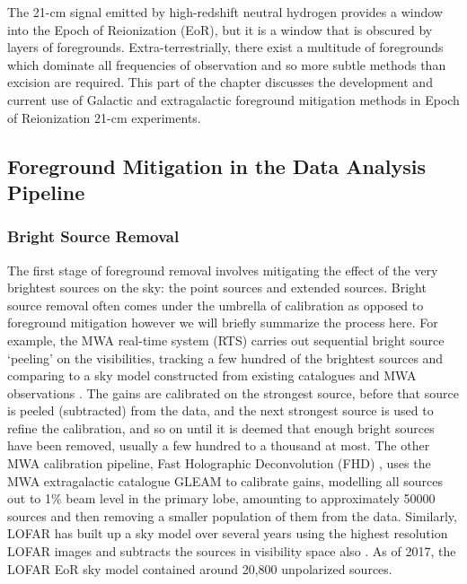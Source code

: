 The 21-cm signal emitted by high-redshift neutral hydrogen provides a window into the Epoch of Reionization (EoR), but it is a window that is obscured by layers of foregrounds. Extra-terrestrially, there exist a multitude of foregrounds which dominate all frequencies of observation and so more subtle methods than excision are required. This part of the chapter discusses the development and current use of Galactic and extragalactic foreground mitigation methods in Epoch of Reionization 21-cm experiments.

\subsection{Foreground Mitigation in the Data Analysis Pipeline}
\subsubsection{Bright Source Removal}
The first stage of foreground removal involves mitigating the effect of the very brightest sources on the sky: the point sources and extended sources. Bright source removal often comes under the umbrella of calibration as opposed to foreground mitigation however we will briefly summarize the process here. For example, the MWA real-time system (RTS) \cite{Mitchell2008ISTSP...2..707M} carries out sequential bright source `peeling' on the visibilities, tracking a few hundred of the brightest sources and comparing to a sky model constructed from existing catalogues and MWA observations \cite{Carroll2016MNRAS.461.4151C}. The gains are calibrated on the strongest source, before that source is peeled (subtracted) from the data, and the next strongest source is used to refine the calibration, and so on until it is deemed that enough bright sources have been removed, usually a few hundred to a thousand at most. The other MWA calibration pipeline, Fast Holographic Deconvolution (FHD) \cite{Sullivan2012ApJ...759...17S}, uses the MWA extragalactic catalogue GLEAM \cite{hurleywalker17} to calibrate gains, modelling all sources out to 1$\%$ beam level in the primary lobe, amounting to approximately 50000 sources \cite{Barry2019arXiv190102980B} and then removing a smaller population of them from the data. Similarly, LOFAR has built up a sky model over several years using the highest resolution LOFAR images and subtracts the sources in visibility space also \cite{Yata2015MNRAS.449.4506Y,Yata2013AA...550A.136Y}. As of 2017, the LOFAR EoR sky model contained around 20,800 unpolarized sources. 

